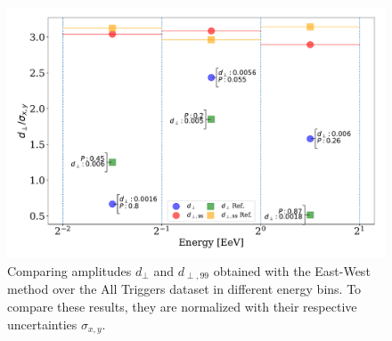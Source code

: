 \documentclass[12pt, doublespace, oneside]{article}
\begin{document}
    \begin{figure}[H]
        \begin{small}
            \begin{center}
                \vspace*{-0.21 cm}
                \includegraphics[width=\textwidth]{Figs/d_perp_normalizado_sigmas_v6.pdf}
                \vspace*{-1 cm}
            \end{center}
            \caption{Comparing amplitudes  $d_\perp$ and $d_{\perp,99}$  obtained with the East-West method over the All Triggers dataset in different energy bins. To compare these results, they are normalized with their respective uncertainties $\sigma_{x,y}$. }
            \label{fig:normalizado_sigma}
        \end{small}
    \end{figure}



\end{document}
